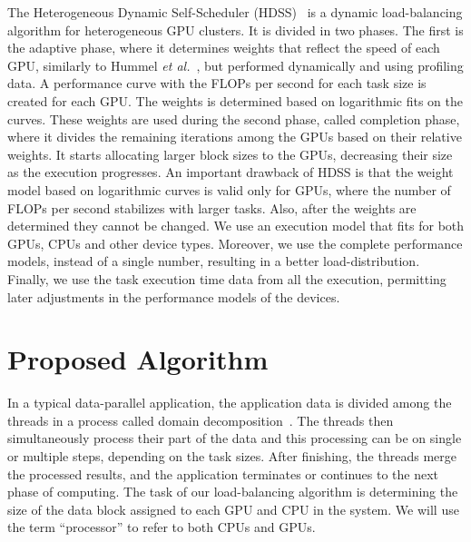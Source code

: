 \documentclass[journal]{IEEEtran}
\begin{document}
The Heterogeneous Dynamic Self-Scheduler (HDSS)~\cite{HDSS} is a dynamic
load-balancing algorithm for heterogeneous GPU clusters. It is divided in two
phases. The first is the adaptive phase, where it determines weights that
reflect the speed of each GPU, similarly to Hummel \emph{et al.}~\cite{Hummel},
but performed dynamically and using profiling data. A performance curve with the
FLOPs per second for each task size is created for each GPU. The weights is
determined based on logarithmic fits on the curves.  These weights are used
during the second phase, called completion phase, where it divides the remaining
iterations among the GPUs based on their relative weights. It starts allocating
larger block sizes to the GPUs, decreasing their size as the execution
progresses. An important drawback of HDSS is that the weight model based on
logarithmic curves is valid only for GPUs, where the number of FLOPs per second
stabilizes with larger tasks. Also, after the weights are determined they cannot
be changed. We use an execution model that fits for both GPUs, CPUs and other
device types. Moreover, we use the complete performance models, instead of a
single number, resulting in a better load-distribution. Finally, we use the task
execution time data from all the execution, permitting later adjustments in the
performance models of the devices.



\section{Proposed Algorithm}

In a typical data-parallel application, the application data is divided among
the threads in a process called domain decomposition~\cite{Gropp:1992uq}. The
threads then simultaneously process their part of the data and this processing
can be on single or multiple steps, depending on the task sizes. After
finishing, the threads merge the processed results, and the application
terminates or continues to the next phase of computing. The task of our
load-balancing algorithm is determining the size of the data block assigned to
each GPU and CPU in the system. We will use the term ``processor'' to refer to
both CPUs and GPUs.

\vspace{0.2cm}
\end{document}
